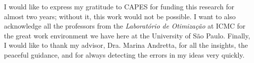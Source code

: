 I would like to express my gratitude to CAPES for funding this research for almost two years; without it, this work would not be possible.
I want to also acknowledge all the professors from the \textit{Laboratório de Otimização} at ICMC for the great work environment we have here at the University of São Paulo. 
Finally, I would like to thank my advisor, Dra. Marina Andretta, for all the insights, the peaceful guidance, and for always detecting the errors in my ideas very quickly.